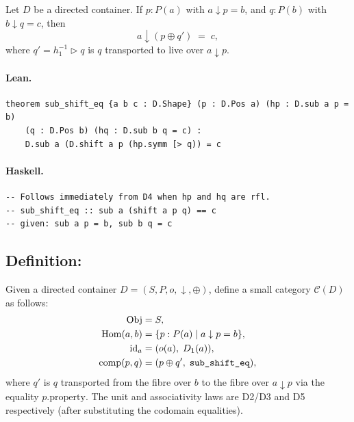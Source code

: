\documentclass[11pt,a4paper]{article}
\begin{document}
\begin{prop}
Let $D$ be a directed container.  If $p : P(a)$ with $a \downarrow p = b$,
and $q : P(b)$ with $b \downarrow q = c$, then
\[
  a \downarrow (p \oplus q') \;=\; c,
\]
where $q' = h_1^{-1} \triangleright q$ is $q$ transported to live over $a \downarrow p$.
\end{prop}

\paragraph{Lean.}
\begin{lstlisting}[style=lean]
theorem sub_shift_eq {a b c : D.Shape} (p : D.Pos a) (hp : D.sub a p = b)
    (q : D.Pos b) (hq : D.sub b q = c) :
    D.sub a (D.shift a p (hp.symm [> q)) = c
\end{lstlisting}

\paragraph{Haskell.}
\begin{lstlisting}[style=haskell]
-- Follows immediately from D4 when hp and hq are rfl.
-- sub_shift_eq :: sub a (shift a p q) == c
-- given: sub a p = b, sub b q = c
\end{lstlisting}


\subsection{Definition: }

\begin{defn}
Given a directed container $D = (S, P, o, {\downarrow}, {\oplus})$, define a
small category $\mathcal{C}(D)$ as follows:
\begin{align*}
  \mathrm{Obj} &= S, \\
  \mathrm{Hom}(a, b) &= \{ p : P(a) \mid a \downarrow p = b \}, \\
  \mathrm{id}_a &= (o(a),\; D_1(a)), \\
  \mathrm{comp}(p, q) &= (p \oplus q',\; \text{\texttt{sub\_shift\_eq}}),
\end{align*}
where $q'$ is $q$ transported from the fibre over $b$ to the fibre over
$a \downarrow p$ via the equality $p.\mathrm{property}$.
The unit and associativity laws are D2/D3 and D5 respectively (after
substituting the codomain equalities).
\end{defn}
\end{document}
